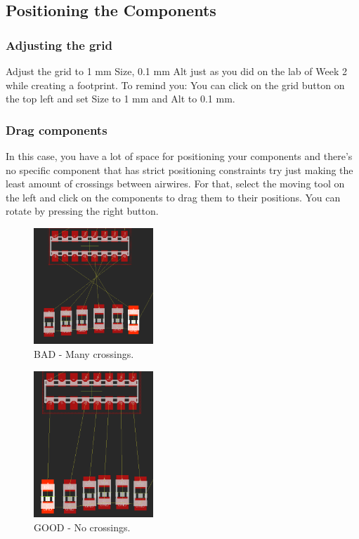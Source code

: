 \documentclass{article}
\begin{document}
\subsection{Positioning the Components}
\subsubsection{Adjusting the grid}
Adjust the grid to 1 mm Size, 0.1 mm Alt just as you did on the lab of Week 2 while creating a footprint. To remind you: You can click on the grid button on the top left and set Size to 1 mm and Alt to 0.1 mm.
\pagebreak
\subsubsection{Drag components}
In this case, you have a lot of space for positioning your components and there's no specific component that has strict positioning constraints try just making the least amount of crossings between airwires. For that, select the moving tool on the left and click on the components to drag them to their positions. You can rotate by pressing the right button.

\begin{figure}[ht]
	\center
	\includegraphics[width=0.4\textwidth, keepaspectratio]{images/cross.png}
	\caption{BAD - Many crossings.}
	\label{fig:cross}
\end{figure}

\begin{figure}[ht]
	\center
	\includegraphics[width=0.4\textwidth, keepaspectratio]{images/no-cross.png}
	\caption{GOOD - No crossings.}
	\label{fig:no-cross}
\end{figure}
\pagebreak
\end{document}
